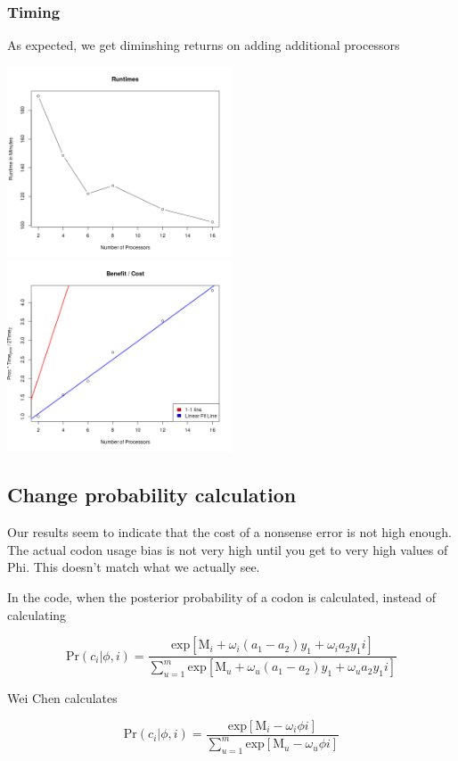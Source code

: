 \subsubsection{Timing}

As expected, we get diminshing returns on adding additional processors

\includegraphics[width=0.5\textwidth]{data/1105runtimes.png}
\includegraphics[width=0.5\textwidth]{data/1105timingCostBenefit.png}


\subsection{Change probability calculation}

Our results seem to indicate that the cost of a nonsense error is not high enough. The actual codon usage bias is not very high until you get to very high values of Phi. This doesn't match what we actually see.

In the code, when the posterior probability of a codon is calculated, instead of calculating

\[
\mbox{Pr}(c_i|\phi,i)
=
\frac{
\mbox{exp}[\mbox{M}_i
+ \omega_i(a_1-a_2)y_1
+ \omega_ia_2y_1 i
]
}{
\sum_{u=1}^m
\mbox{exp}[\mbox{M}_u
+ \omega_u(a_1-a_2)y_1
+ \omega_ua_2y_1 i
]
}
\]

Wei Chen calculates

\[
\mbox{Pr}(c_i|\phi,i)
=
\frac{
\mbox{exp}[\mbox{M}_i
- \omega_i\phi i
]
}{
\sum_{u=1}^m
\mbox{exp}[\mbox{M}_u
- \omega_u\phi i
]
}
\]

